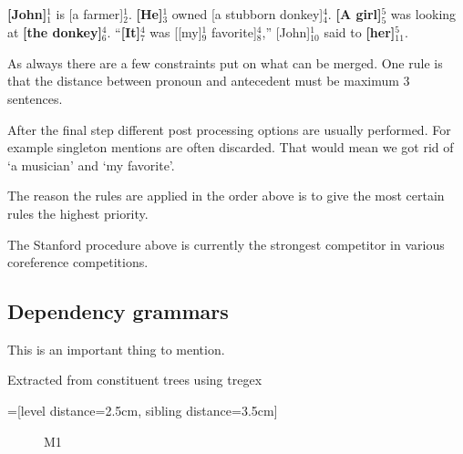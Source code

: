 \documentclass[12pt]{article}
\begin{document}
\begin{description}
\textbf{[John]$_1^1$} is [a farmer]$_2^1$. \textbf{[He]$_3^1$} owned [a stubborn donkey]$_4^4$.\newline
\textbf{[A girl]$_5^5$} was looking at \textbf{[the donkey]$_6^4$}.\newline
``\textbf{[It]$_7^4$} was [[my]$_9^1$ favorite]$_8^4$,'' [John]$_{10}^1$ said to \textbf{[her]$_{11}^{5}$}.

As always there are a few constraints put on what can be merged. One rule is that the distance between pronoun and antecedent must be maximum 3 sentences.
\end{description}

After the final step different post processing options are usually performed. For example singleton mentions are often discarded. That would mean we got rid of `a musician' and `my favorite'.

The reason the rules are applied in the order above is to give the most certain rules the highest priority.

The Stanford procedure above is currently the strongest competitor in various coreference competitions.

\subsection{Dependency grammars}

This is an important thing to mention.

Extracted from constituent trees using tregex\cite{de2006generating}

=[level distance=2.5cm, sibling distance=3.5cm]
\begin{figure}
\centering
{}
\caption{M1} \label{fig:M1}
\end{figure}
\end{document}
